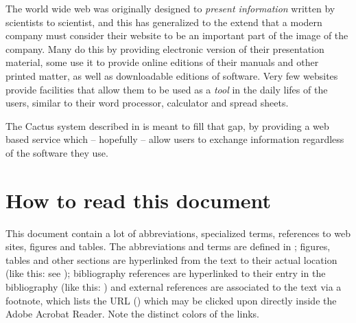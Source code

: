 The world wide web was originally designed to \textit{present
  information} written by scientists to scientist, and this has
generalized to the extend that a modern company must consider their
website to be an important part of the image of the company.  Many do
this by providing electronic version of their presentation material,
some use it to provide online editions of their manuals and other
printed matter, as well as downloadable editions of software.  Very
few websites provide facilities that allow them to be used as a
\textit{tool} in the daily lifes of the users, similar to their word
processor, calculator and spread sheets.

The Cactus system described in  is meant to fill
that gap, by providing a web based service which -- hopefully -- allow
users to exchange information regardless of the software they use.






\section{How to read this document}
\label{sec:how-to-read-this-document}

This document contain a lot of abbreviations, specialized terms,
references to web sites, figures and tables.  The abbreviations and
terms are defined in ; figures, tables
and other sections are hyperlinked from the text to their actual
location (like this: see ); bibliography
references are hyperlinked to their entry in the bibliography (like
this: \cite{goedelescherbach}) and external references are associated
to the text via a footnote, which lists the URL
() which may be
clicked upon directly inside the Adobe Acrobat Reader.  Note the
distinct colors of the links.

